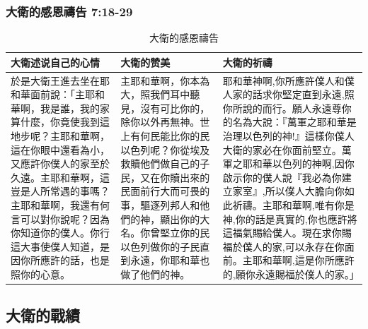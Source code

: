 \subsubsection{大衛的感恩禱告 7:18-29}
\begin{table}[H]
\centering 
\begin{tabular}{p{5.15cm}|p{4.7cm}|p{7.2cm}}\hline\hline
大衛述说自己的心情&大衛的赞美&大衛的祈禱 \\\hline
於是大衛王進去坐在耶和華面前說：「主耶和華啊，我是誰，我的家算什麼，你竟使我到這地步呢？主耶和華啊，這在你眼中還看為小，又應許你僕人的家至於久遠。主耶和華啊，這豈是人所常遇的事嗎？主耶和華啊，我還有何言可以對你說呢？因為你知道你的僕人。你行這大事使僕人知道，是因你所應許的話，也是照你的心意。
&主耶和華啊，你本為大，照我們耳中聽見，沒有可比你的，除你以外再無神。世上有何民能比你的民以色列呢？你從埃及救贖他們做自己的子民，又在你贖出來的民面前行大而可畏的事，驅逐列邦人和他們的神，顯出你的大名。你曾堅立你的民以色列做你的子民直到永遠，你耶和華也做了他們的神。
&耶和華神啊,你所應許僕人和僕人家的話求你堅定直到永遠,照你所說的而行。願人永遠尊你的名為大說：『萬軍之耶和華是治理以色列的神!』這樣你僕人大衛的家必在你面前堅立。萬軍之耶和華以色列的神啊,因你啟示你的僕人說『我必為你建立家室』,所以僕人大膽向你如此祈禱。主耶和華啊,唯有你是神,你的話是真實的,你也應許將這福氣賜給僕人。現在求你賜福於僕人的家,可以永存在你面前。主耶和華啊,這是你所應許的,願你永遠賜福於僕人的家。」\\\hline
\end{tabular}
\caption{大衛的感恩禱告}
\end{table}

 
\subsection{大衛的戰績}
